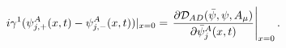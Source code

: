 \begin{equation}
i\gamma ^{1}(\psi _{j,+}^{A}(x,t)-\psi _{j,-}^{A}(x,t))|_{x=0}=\left. \frac{%
\partial \mathcal{D}_{AD}(\bar{\psi},\psi ,A_{\mu })}{\partial \bar{\psi}%
_{j}^{A}(x,t)}\right| _{x=0}.  \label{bcon}
\end{equation}

